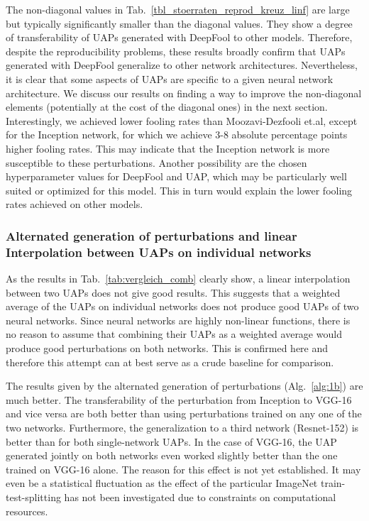 \documentclass[runningheads]{llncs}
\begin{document}
The non-diagonal values in Tab.~\ref{tbl_stoerraten_reprod_kreuz_linf} are large but typically significantly smaller than the diagonal values. They show a degree of transferability of UAPs generated with DeepFool to other models. Therefore, despite the reproducibility problems, these results broadly confirm that UAPs generated with DeepFool generalize to other network architectures. Nevertheless, it is clear that some aspects of UAPs are specific to a given neural network architecture. We discuss our results on finding a way to improve the non-diagonal elements (potentially at the cost of the diagonal ones) in the next section.
Interestingly, we achieved lower fooling rates than Moozavi-Dezfooli et.al, except for the Inception network, for which we achieve 3-8 absolute percentage points higher fooling rates. This may indicate that the Inception network is more susceptible to these perturbations. Another possibility are the chosen hyperparameter values for DeepFool and UAP, which may be particularly well suited or optimized for this model. This in turn would explain the lower fooling rates achieved on other models.

\subsubsection{Alternated generation of perturbations and linear Interpolation be\-tween UAPs on individual networks}
As the results in Tab.~\ref{tab:vergleich_comb} clearly show, a linear interpolation between two UAPs does not give good results. This suggests that a weighted average of the UAPs on individual networks does not produce good UAPs of two neural networks. Since neural networks are highly non-linear functions, there is no reason to assume that combining their UAPs as a weighted average would produce good perturbations on both networks. This is confirmed here and therefore this attempt can at best serve as a crude baseline for comparison. 

The results given by the alternated generation of perturbations (Alg.~\ref{alg:1b}) are much better. The transferability of the perturbation from Inception to VGG-16 and vice versa are both better than using perturbations trained on any one of the two networks. Furthermore, the generalization to a third network (Resnet-152) is better than for both single-network UAPs. In the case of VGG-16, the UAP generated jointly on both networks even worked slightly better than the one trained on VGG-16 alone. The reason for this effect is not yet established. It may even be a statistical fluctuation as the effect of the particular ImageNet train-test-splitting has not been investigated due to constraints on computational resources. 
\end{document}
